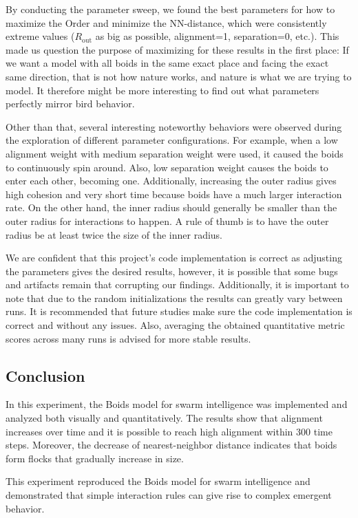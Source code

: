 \documentclass{article}
\begin{document}
By conducting the parameter sweep, we found the best parameters for how to maximize the Order and minimize the NN-distance, which were consistently extreme values ($R_{\text{out}}$ as big as possible, alignment=1, separation=0, etc.). This made us question the purpose of maximizing for these results in the first place: If we want a model with all boids in the same exact place and facing the exact same direction, that is not how nature works, and nature is what we are trying to model. It therefore might be more interesting to find out what parameters perfectly mirror bird behavior.

Other than that, several interesting noteworthy behaviors were observed during the exploration of different parameter configurations. For example, when a low alignment weight with medium separation weight were used, it caused the boids to continuously spin around. Also, low separation weight causes the boids to enter each other, becoming one. Additionally, increasing the outer radius gives high cohesion and very short time because boids have a much larger interaction rate. On the other hand, the inner radius should generally be smaller than the outer radius for interactions to happen. A rule of thumb is to have the outer radius be at least twice the size of the inner radius.


We are confident that this project's code implementation is correct as adjusting the parameters gives the desired results, however, it is possible that some bugs and artifacts remain that corrupting our findings. Additionally, it is important to note that due to the random initializations the results can greatly vary between runs. It is recommended that future studies make sure the code implementation is correct and without any issues. Also, averaging the obtained quantitative metric scores across many runs is advised for more stable results. 


\subsection{Conclusion}

In this experiment, the Boids model for swarm intelligence was implemented and analyzed both visually and quantitatively. The results show that alignment increases over time and it is possible to reach high alignment within 300 time steps. Moreover, the decrease of nearest-neighbor distance indicates that boids form flocks that gradually increase in size. 

This experiment reproduced the Boids model for swarm intelligence and demonstrated that simple interaction rules can give rise to complex emergent behavior.  
\end{document}
